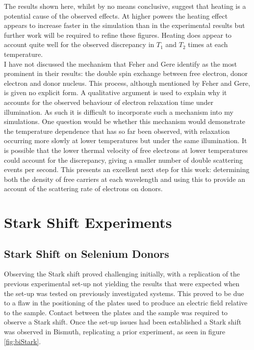 The results shown here, whilst by no means conclusive, suggest that heating is a potential cause of the observed effects.
At higher powers the heating effect appears to increase faster in the simulation than in the experimental results but further work will be required to refine these figures.
Heating does appear to account quite well for the observed discrepancy in $T_1$ and $T_2$ times at each temperature.
\\
I have not discussed the mechanism that Feher and Gere identify as the most prominent in their results: the double spin exchange between free electron, donor electron and donor nucleus.
This process, although mentioned by Feher and Gere, is given no explicit form.
A qualitative argument is used to explain why it accounts for the observed behaviour of electron relaxation time under illumination.
As such it is difficult to incorporate such a mechanism into my simulations.
One question would be whether this mechanism would demonstrate the temperature dependence that has so far been observed, with relaxation occurring more slowly at lower temperatures but under the same illumination.
It is possible that the lower thermal velocity of free electrons at lower temperatures could account for the discrepancy, giving a smaller number of double scattering events per second.
This presents an excellent next step for this work: determining both the density of free carriers at each wavelength and using this to provide an account of the scattering rate of electrons on donors.

\section{Stark Shift Experiments}

\subsection{Stark Shift on Selenium Donors}

Observing the Stark shift proved challenging initially, with a replication of the previous experimental set-up not yielding the results that were expected when the set-up was tested on previously investigated systems.
This proved to be due to a flaw in the positioning of the plates used to produce an electric field relative to the sample.
Contact between the plates and the sample was required to observe a Stark shift.
Once the set-up issues had been established a Stark shift was observed in Bismuth, replicating a prior experiment, as seen in figure \ref{fig:biStark}.



